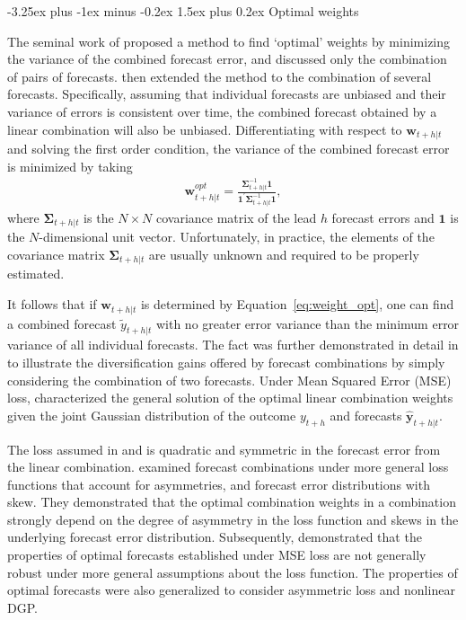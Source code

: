 \documentclass[11pt]{article}
\makeatletter
\renewcommand{\paragraph}{\@startsection{paragraph}{4}{0ex}%
   {-3.25ex plus -1ex minus -0.2ex}%
   {1.5ex plus 0.2ex}%
   {\normalfont\normalsize\bfseries}}
\makeatother
\begin{document}
\paragraph{Optimal weights}

The seminal work of \cite{Bates1969-yj} proposed a method to find `optimal' weights by minimizing the variance of the combined forecast error, and discussed only the combination of pairs of forecasts. \cite{Newbold1974-lp} then extended the method to the combination of several forecasts. Specifically, assuming that individual forecasts are unbiased and their variance of errors is consistent over time, the combined forecast obtained by a linear combination will also be unbiased. Differentiating with respect to $\boldsymbol{w}_{t+h|t}$ and solving the first order condition, the variance of the combined forecast error is minimized by taking
\begin{align}
\label{eq:weight_opt}
\boldsymbol{w}_{t+h|t}^{opt}=\frac{\boldsymbol{\Sigma}_{t+h|t}^{-1}\mathbf{1}}{\mathbf{1}^{\prime} \boldsymbol{\Sigma}_{t+h|t}^{-1} \mathbf{1}},
\end{align}
where $\boldsymbol{\Sigma}_{t+h|t}$ is the $N \times N$ covariance matrix of the lead $h$ forecast errors and $\mathbf{1}$ is the $N$-dimensional unit vector. Unfortunately, in practice, the elements of the covariance matrix $\boldsymbol{\Sigma}_{t+h|t}$ are usually unknown and required to be properly estimated.

It follows that if $\boldsymbol{w}_{t+h|t}$ is determined by Equation~\eqref{eq:weight_opt}, one can find a combined forecast $\tilde{y}_{t+h|t}$ with no greater error variance than the minimum error variance of all individual forecasts. The fact was further demonstrated in detail in \cite{Timmermann2006-en} to illustrate the diversification gains offered by forecast combinations by simply considering the combination of two forecasts. Under Mean Squared Error (MSE) loss, \cite{Timmermann2006-en} characterized the general solution of the optimal linear combination weights given the joint Gaussian distribution of the outcome $y_{t+h}$ and forecasts $\hat{\mathbf{y}}_{t+h|t}$.

The loss assumed in \cite{Bates1969-yj} and \cite{Newbold1974-lp} is quadratic and symmetric in the forecast error from the linear combination. \cite{Elliott2004-dz} examined forecast combinations under more general loss functions that account for asymmetries, and forecast error distributions with skew. They demonstrated that the optimal combination weights in a combination strongly depend on the degree of asymmetry in the loss function and skews in the underlying forecast error distribution. Subsequently, \cite{Patton2007-zo} demonstrated that the properties of optimal forecasts established under MSE loss are not generally robust under more general assumptions about the loss function. The properties of optimal forecasts were also generalized to consider asymmetric loss and nonlinear DGP.
\end{document}
